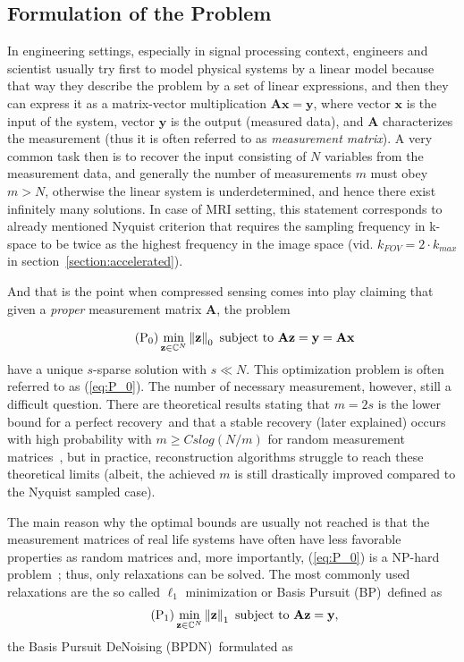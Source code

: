\subsection{Formulation of the Problem}
In engineering settings, especially in signal processing context, engineers and scientist usually try first to model physical systems by a linear model because that way they describe the problem by a set of linear expressions, and then they can express it as a matrix-vector multiplication $\mathbf{Ax} = \mathbf{y}$, where vector $\mathbf{x}$ is the input of the system, vector $\mathbf{y}$ is the output (measured data), and $\mathbf{A}$ characterizes the measurement (thus it is often referred to as \textit{measurement matrix}). A very common task then is to recover the input consisting of $N$ variables from the measurement data, and generally the number of measurements $m$ must obey $m > N$, otherwise the linear system is underdetermined, and hence there exist infinitely many solutions. In case of MRI setting, this statement corresponds to already mentioned Nyquist criterion that requires the sampling frequency in k-space to be twice as the highest frequency in the image space (vid. $k_{FOV} = 2 \cdot k_{max}$ in section~\ref{section:accelerated}).

And that is the point when compressed sensing comes into play claiming that given a \textit{proper} measurement matrix $\mathbf{A}$, the problem

\begin{equation}
    \tag{P\textsubscript{0}}\label{eq:P_0}
    \min_{\mathbf{z} \in \mathbb{C}^N} \norm{\mathbf{z}}_0 \text{ subject to } \mathbf{Az} = \mathbf{y} = \mathbf{Ax}
\end{equation}
have a unique $s$-sparse solution with $s \ll N$. This optimization problem is often referred to as (\ref{eq:P_0}). The number of necessary measurement, however, still a difficult question. There are theoretical results stating that $m = 2s$ is the lower bound for a perfect recovery~\citationneeded and that a stable recovery (later explained) occurs with high probability with $m \ge C s log(N / m)$ for random measurement matrices~\citationneeded, but in practice, reconstruction algorithms struggle to reach these theoretical limits (albeit, the achieved $m$ is still drastically improved compared to the Nyquist sampled case).

The main reason why the optimal bounds are usually not reached is that the measurement matrices of real life systems have often have less favorable properties as random matrices and, more importantly, (\ref{eq:P_0}) is a NP-hard problem~\citationneeded; thus, only relaxations can be solved. The most commonly used relaxations are the so called $\ell_1$ minimization or Basis Pursuit (BP)~\citationneeded defined as
\begin{equation}
    \tag{P\textsubscript{1}}\label{eq:P_1}
    \min_{\mathbf{z} \in \mathbb{C}^N} \norm{\mathbf{z}}_1 \text{ subject to } \mathbf{Az} = \mathbf{y},
\end{equation}
the Basis Pursuit DeNoising (BPDN)~\citationneeded formulated as


